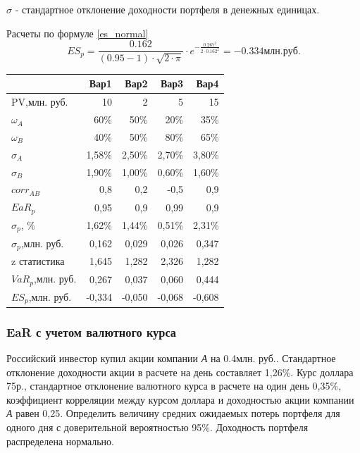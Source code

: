 \documentclass[12pt, table, a4paper,twoside]{exam}
\begin{document}
\begin{questions}
\begin{solution}[12em]
$\sigma$ - стандартное отклонение доходности портфеля в денежных единицах.

Расчеты по формуле \eqref{es_normal} 
$$ES_{p}=\frac{0.162}{(0.95-1)\cdot \sqrt{2 \cdot \pi}}\cdot e^{-\frac{0.267^2}{2 \cdot 0.162^2}}=-0.334млн. руб.$$

\centering
\begin{tabular}{lrrrr}
	\toprule
	               &   Вар1 &   Вар2 &   Вар3 &   Вар4 \\ \midrule
	PV,млн. руб.         &     10 &      2 &      5 &     15 \\
	$\omega_A$     &   60\% &   50\% &   20\% &   35\% \\
	$\omega_B$     &   40\% &   50\% &   80\% &   65\% \\
	$\sigma_A$     & 1,58\% & 2,50\% & 2,70\% & 3,80\% \\
	$\sigma_B$     & 1,90\% & 1,00\% & 0,60\% & 1,60\% \\
	$corr_{AB}$    &    0,8 &    0,2 &   -0,5 &    0,9 \\
	$EaR_p$        &   0,95 &    0,9 &   0,99 &    0,9 \\ \midrule
	$\sigma_p$, \% & 1,62\% & 1,44\% & 0,51\% & 2,31\% \\
	$\sigma_p$,млн. руб. &  0,162 &  0,029 &  0,026 &  0,347 \\
	z статистика   &  1,645 &  1,282 &  2,326 &  1,282 \\
	$VaR_p$,млн. руб.    &  0,267 &  0,037 &  0,060 &  0,444 \\
	$ES_p$,млн. руб.     & -0,334 & -0,050 & -0,068 & -0,608 \\ \bottomrule
\end{tabular}%
\end{solution}

\subsubsection{EaR с учетом валютного курса}
\question[10] Российский инвестор купил акции компании \textit{А }на 0.4млн. руб.. Стандартное отклонение доходности акции в расчете на день составляет 1,26\%. Курс доллара 75р., стандартное отклонение валютного курса в расчете на один день 0,35\%, коэффициент корреляции между курсом доллара и доходностью акции компании \textit{А} равен 0,25. Определить величину средних ожидаемых потерь портфеля для одного дня с доверительной вероятностью 95\%. Доходность портфеля распределена нормально.

\begin{solution}[12em]


\end{solution}
\end{questions}
\end{document}
